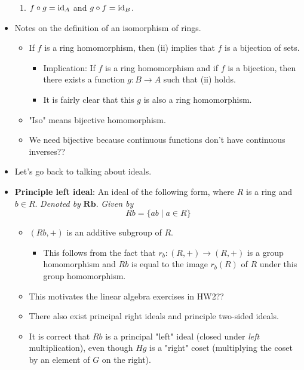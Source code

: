 \documentclass[../notes.tex]{subfiles}
\begin{document}
\begin{itemize}
\begin{enumerate}[label={(\roman*)}]
        \item $f\circ g=\operatorname{id}_A$ and $g\circ f=\operatorname{id}_B$.
    \end{enumerate}
    \item Notes on the definition of an isomorphism of rings.
    \begin{itemize}
        \item If $f$ is a ring homomorphism, then (ii) implies that $f$ is a bijection of sets.
        \begin{itemize}
            \item Implication: If $f$ is a ring homomorphism and if $f$ is a bijection, then there exists a function $g:B\to A$ such that (ii) holds.
            \item It is fairly clear that this $g$ is also a ring homomorphism.
        \end{itemize}
        \item "Iso" means bijective homomorphism.
        \item We need bijective because continuous functions don't have continuous inverses??
    \end{itemize}
    \item Let's go back to talking about ideals.
    \item \textbf{Principle left ideal}: An ideal of the following form, where $R$ is a ring and $b\in R$. \emph{Denoted by} $\bm{Rb}$. \emph{Given by}
    \begin{equation*}
        Rb = \{ab\mid a\in R\}
    \end{equation*}
    \begin{itemize}
        \item $(Rb,+)$ is an additive subgroup of $R$.
        \begin{itemize}
            \item This follows from the fact that $r_b:(R,+)\to(R,+)$ is a group homomorphism and $Rb$ is equal to the image $r_b(R)$ of $R$ under this group homomorphism.
        \end{itemize}
        \item This motivates the linear algebra exercises in HW2??
        \item There also exist principal right ideals and principle two-sided ideals.
        \item It is correct that $Rb$ is a principal "left" ideal (closed under \emph{left} multiplication), even though $Hg$ is a "right" coset (multiplying the coset by an element of $G$ on the right).
    \end{itemize}

\end{itemize}
\end{document}
